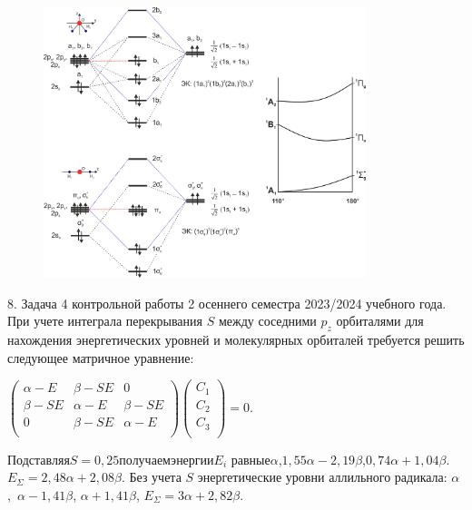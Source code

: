 \vspace{-\parskip}
\vspace{5mm}
\begin{figure}[h]
\includegraphics[width=9.4cm]{images/Fig_1_7_8_dec.png}
\centering
\end{figure}
\vspace{-\parskip}
\par
8. Задача 4 контрольной работы 2 осеннего семестра 2023/2024 учебного года. При учете интеграла перекрывания $S$ между соседними $p_z$ орбиталями для нахождения энергетических уровней и молекулярных орбиталей требуется решить следующее матричное уравнение:\par
\vspace{-\parskip}
\vspace{2mm}
\hspace{7mm}
$\begin{pmatrix}
\alpha-E & \beta-SE & 0 \\
\beta-SE & \alpha-E & \beta-SE \\
0 & \beta-SE & \alpha-E \\
\end{pmatrix}
\begin{pmatrix}
C_1 \\
C_2 \\
C_3 \\
\end{pmatrix}=0.$\par
\vspace{-\parskip}
\vspace{2mm}
Подставляя\hspace{\fill}$S=0,25$\hspace{\fill}получаем\hspace{\fill}энергии\hspace{\fill}$E_i$ равные\hspace{\fill}$\alpha$,\hspace{\fill}$1,55\alpha-2,19\beta$,\hspace{\fill}$0,74\alpha+1,04\beta$.\\ $E_{\Sigma}=2,48\alpha+2,08\beta$. Без учета $S$ энергетические уровни аллильного радикала: $\alpha$,~$\alpha-1,41\beta$, $\alpha+1,41\beta$, $E_{\Sigma}=3\alpha+2,82\beta$.\par
